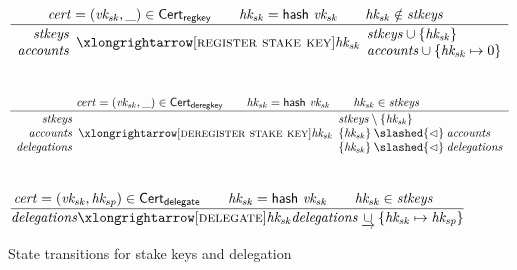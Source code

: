 \documentclass[11pt,a4paper]{article}
\newcommand{\restrictdom}{\lhd}
\newcommand{\subtractdom}{\mathbin{\slashed{\restrictdom}}}
\newcommand{\union}{\cup}
\newcommand{\unionoverride}{\mathbin{\underrightarrow\cup}}
\newcommand{\var}[1]{\mathit{#1}}
\newcommand{\fun}[1]{\mathsf{#1}}
\newcommand{\type}[1]{\mathsf{#1}}
\newcommand{\transitionarrow}[2]{\xlongrightarrow[\textsc{#1}]{#2}}
\begin{document}
\begin{figure}
\begin{equation*}
\frac{
  \var{cert} = (\var{vk_{sk}}, \_)\in \type{Cert_{regkey}} \qquad
  \var{hk_{sk}} = \fun{hash} ~ \var{vk_{sk}} \qquad
  \var{hk_{sk}} \notin \var{stkeys} \qquad
}{
  \begin{array}{r}
    \var{stkeys} \\
    \var{accounts}
  \end{array}
  \transitionarrow{register stake key}{\var{hk_{sk}}}
  \begin{array}{l}
    \var{stkeys} \union \{\var{hk_{sk}}\} \\
    \var{accounts} \union \{\var{hk_{sk}} \mapsto 0\}
  \end{array}
}
\end{equation*}
%
\\[1em]
%
\begin{equation*}
\frac{
  \var{cert} = (\var{vk_{sk}}, \_)\in \type{Cert_{deregkey}} \qquad
  \var{hk_{sk}} = \fun{hash} ~ \var{vk_{sk}} \qquad
  \var{hk_{sk}} \in \var{stkeys} \qquad
}{
  \begin{array}{r}
    \var{stkeys} \\ \var{accounts} \\ \var{delegations}
  \end{array}
  \transitionarrow{deregister stake key}{\var{hk_{sk}}}
  \begin{array}{l}
  \var{stkeys} \setminus \{\var{hk_{sk}}\} \\
  \{\var{hk_{sk}}\} \subtractdom \var{accounts} \\
  \{\var{hk_{sk}}\} \subtractdom \var{delegations}
  \end{array}
}
\end{equation*}
%
\\[1em]
%
\begin{equation*}
\frac{
  \var{cert} = (\var{vk_{sk}}, \var{hk_{sp}}) \in \type{Cert_{delegate}} \qquad
  \var{hk_{sk}} = \fun{hash} ~ \var{vk_{sk}} \qquad
  \var{hk_{sk}} \in \var{stkeys} \qquad
}{
  \var{delegations}
  \transitionarrow{delegate}{\var{hk_{sk}}}
  \var{delegations} \unionoverride \{\var{hk_{sk}} \mapsto \var{hk_{sp}}\}
}
\end{equation*}

\caption{State transitions for stake keys and delegation}
\label{fig:delegation_transitions}
\end{figure}
\end{document}
